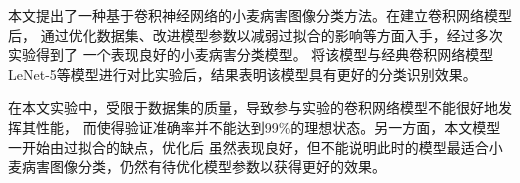本文提出了一种基于卷积神经网络的小麦病害图像分类方法。在建立卷积网络模型后，
通过优化数据集、改进模型参数以减弱过拟合的影响等方面入手，经过多次实验得到了
一个表现良好的小麦病害分类模型。
将该模型与经典卷积网络模型LeNet-5等模型进行对比实验后，结果表明该模型具有更好的分类识别效果。

在本文实验中，受限于数据集的质量，导致参与实验的卷积网络模型不能很好地发挥其性能，
而使得验证准确率并不能达到99\%的理想状态。另一方面，本文模型一开始由过拟合的缺点，优化后
虽然表现良好，但不能说明此时的模型最适合小麦病害图像分类，仍然有待优化模型参数以获得更好的效果。
